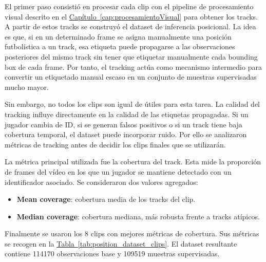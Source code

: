 El primer paso consistió en procesar cada clip con el pipeline de procesamiento visual descrito en el \hyperref[cap:procesamientoVisual]{Capítulo~\ref*{cap:procesamientoVisual}} para obtener los tracks. A partir de estos tracks se construyó el dataset de inferencia posicional. La idea es que, si en un determinado frame se asigna manualmente una posición futbolística a un track, esa etiqueta puede propagarse a las observaciones posteriores del mismo track sin tener que etiquetar manualmente cada bounding box de cada frame. Por tanto, el tracking actúa como mecanismo intermedio para convertir un etiquetado manual escaso en un conjunto de muestras supervisadas mucho mayor.

Sin embargo, no todos los clips son igual de útiles para esta tarea. La calidad del tracking influye directamente en la calidad de las etiquetas propagadas. Si un jugador cambia de ID, si se generan falsos positivos o si un track tiene baja cobertura temporal, el dataset puede incorporar ruido. Por ello se analizaron métricas de tracking antes de decidir los clips finales que se utilizarán.

La métrica principal utilizada fue la cobertura del track. Esta mide la proporción de frames del vídeo en los que un jugador se mantiene detectado con un identificador asociado. Se consideraron dos valores agregados:

\begin{itemize}
    \item \textbf{Mean coverage}: cobertura media de los tracks del clip.
    \item \textbf{Median coverage}: cobertura mediana, más robusta frente a tracks atípicos.
\end{itemize}

Finalmente se usaron los 8 clips con mejores métricas de cobertura. Sus métricas se recogen en la \hyperref[tab:position_dataset_clips]{Tabla~\ref*{tab:position_dataset_clips}}. El dataset resultante contiene 114170 observaciones base y 109519 muestras supervisadas.

